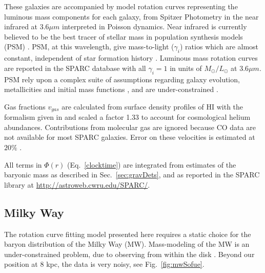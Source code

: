 \documentclass[reprint,%
 amsmath,amssymb,
 aps,
]{revtex4-1}
\begin{document}
These galaxies are  accompanied by model rotation curves representing   the  luminous mass components for each galaxy,  from   Spitzer Photometry in the 
   near infrared  at 3.6$\mu m$ interpreted in Poisson dynamics. 
   Near infrared  is  currently believed to be the best tracer of stellar mass   in population synthesis models (PSM) \cite{10.1093/mnras/sty3223}.  PSM, at this wavelength,   give mass-to-light ($\gamma_i$) ratios which are almost constant, independent of star formation history \cite{BelldYong,10.1093/mnras/sty3223}. Luminous mass rotation curves are reported in the SPARC database with all $\gamma_i=1$ in units of $M_{\odot} / L_{\odot}$   at 3.6$\mu m$. 
   PSM rely upon a complex  suite of  assumptions regarding galaxy evolution, metallicities and initial mass functions  \cite{BelldYong,10.1093/mnras/sty3223}, and are under-constrained  \cite{Conroy,Dutton_2005}.   
   
     Gas fractions $v_{gas}$ are calculated from surface density profiles of HI  with the formalism given in  \cite{1983MNRAS.203..735C} and scaled 
     a factor 1.33 to account for cosmological helium abundances.  Contributions from molecular gas are ignored   because CO data are not available for most SPARC galaxies. 
     Error on these velocities is estimated at $20\%$ \cite{2016Lelli}. 

   
   
     All terms in $\Phi(r)$ (Eq.~\ref{clocktime})  are    integrated from estimates of the baryonic mass as described in Sec.~\ref{sec:gravDets}, and as reported  in the      SPARC  library at \url{http://astroweb.cwru.edu/SPARC/}.    

 
   

  
 


\subsection{Milky Way}\label{MWselect}


The rotation curve fitting model presented here requires a static choice for the baryon distribution of the   Milky Way (MW). 
Mass-modeling of the MW is an under-constrained problem, due to     observing from       within  the disk  \cite{1991ARA&A..29..409F}.
 Beyond our position at 8 kpc, the data is very 
 noisy, see  Fig.~\ref{fig:mwSofue}.  
 
\end{document}
